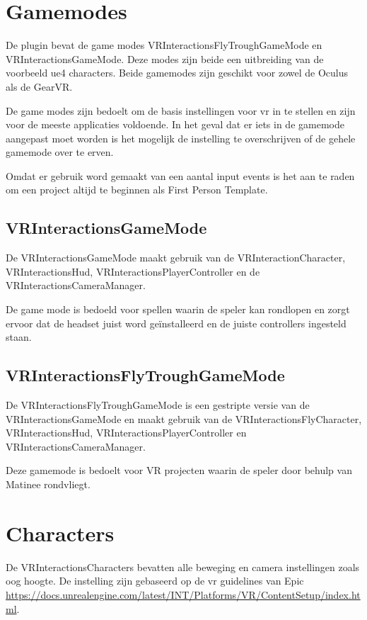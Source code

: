 \section{Gamemodes}
De plugin bevat de game modes VRInteractionsFlyTroughGameMode en VRInteractionsGameMode. Deze modes zijn beide een uitbreiding van de voorbeeld \gls{ue4} characters. Beide gamemodes zijn geschikt voor zowel de Oculus als de GearVR. 

De game modes zijn bedoelt om de basis instellingen voor \gls{vr} in te stellen en zijn voor de meeste applicaties voldoende. In het geval dat er iets in de gamemode aangepast moet worden is het mogelijk de instelling te overschrijven of de gehele gamemode over te erven.

Omdat er gebruik word gemaakt van een aantal input events is het aan te raden om een project altijd te beginnen als First Person Template.

\subsection{VRInteractionsGameMode}
De VRInteractionsGameMode maakt gebruik van de VRInteractionCharacter, VRInteractionsHud, VRInteractionsPlayerController en de VRInteractionsCameraManager. 

De game mode is bedoeld voor spellen waarin de speler kan rondlopen en zorgt ervoor dat de headset juist word geïnstalleerd en de juiste controllers ingesteld staan.

\subsection{VRInteractionsFlyTroughGameMode}
De VRInteractionsFlyTroughGameMode is een gestripte versie van de VRInteractionsGameMode en maakt gebruik van de VRInteractionsFlyCharacter, VRInteractionsHud, VRInteractionsPlayerController en VRInteractionsCameraManager.

Deze gamemode is bedoelt voor VR projecten waarin de speler door behulp van Matinee rondvliegt.

\section{Characters}
De VRInteractionsCharacters bevatten alle beweging en camera instellingen zoals oog hoogte. De instelling zijn gebaseerd op de \gls{vr} guidelines van Epic \href{https://docs.unrealengine.com/latest/INT/Platforms/VR/ContentSetup/index.html#vrcharactersettings}{https://docs.unrealengine.com/latest/INT/Platforms/VR/ContentSetup/index.html}.


